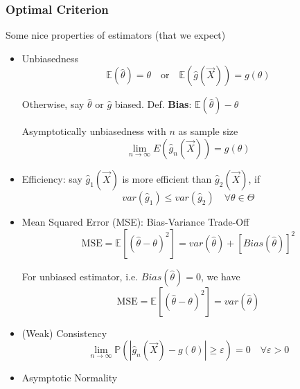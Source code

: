 \subsubsection{Optimal Criterion}\label{SubSectionOptimalCriterion}
        Some nice properties of estimators (that we expect)
    \begin{itemize}
        \item Unbiasedness
        \begin{equation}
            \mathbb{E}(\hat{\theta})=\theta   \quad \text{or}\quad \mathbb{E}(\hat{g}(\vec{X})) =g(\theta)
        \end{equation}

        Otherwise, say $\hat{\theta}$ or $\hat{g}$ biased. Def. \textbf{Bias}: $\mathbb{E}(\hat{\theta})-\theta$

        Asymptotically unbiasedness with $ n $ as sample size
        \begin{equation}
            \lim_{n\to\infty}  E(\hat{g}_n(\vec{X})) =g(\theta)  
        \end{equation}
        \item Efficiency: say $\hat{g}_1(\vec{X})$ is more efficient than $\hat{g}_2(\vec{X})$, if
        \begin{equation}
            var(\hat{g}_1)\leq var(\hat{g}_2)  \quad\forall\theta\in\Theta  
        \end{equation}
        \item Mean Squared Error (MSE): Bias-Variance Trade-Off
        \begin{equation}\label{EqaMSEExpansion}
            \text{MSE}=\mathbb{E}[(\hat{\theta}-\theta)^2]=var(\hat{\theta})+[Bias(\hat{\theta})]^2
        \end{equation}

        For unbiased estimator, i.e. $Bias(\hat{\theta})=0$, we have
        \begin{equation}
            \text{MSE}=\mathbb{E}[(\hat{\theta}-\theta)^2]=var(\hat{\theta})
        \end{equation}
        \item (Weak) Consistency
        \begin{equation}
            \lim_{n\to\infty}\mathbb{P}(|\hat{g}_n(\vec{X})-g(\theta)|\geq \varepsilon)=0\quad\forall\varepsilon>0    
        \end{equation}
        \item Asymptotic Normality
    \end{itemize}


